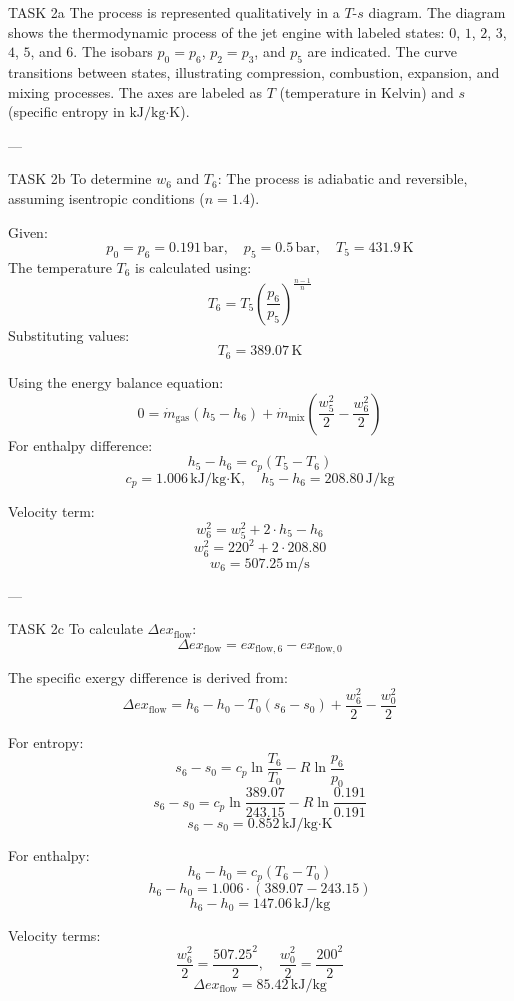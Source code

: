 TASK 2a  
The process is represented qualitatively in a \( T \)-\( s \) diagram. The diagram shows the thermodynamic process of the jet engine with labeled states: \( 0 \), \( 1 \), \( 2 \), \( 3 \), \( 4 \), \( 5 \), and \( 6 \). The isobars \( p_0 = p_6 \), \( p_2 = p_3 \), and \( p_5 \) are indicated. The curve transitions between states, illustrating compression, combustion, expansion, and mixing processes. The axes are labeled as \( T \) (temperature in Kelvin) and \( s \) (specific entropy in \( \text{kJ}/\text{kg·K} \)).

---

TASK 2b  
To determine \( w_6 \) and \( T_6 \):  
The process is adiabatic and reversible, assuming isentropic conditions (\( n = 1.4 \)).  

Given:  
\[
p_0 = p_6 = 0.191 \, \text{bar}, \quad p_5 = 0.5 \, \text{bar}, \quad T_5 = 431.9 \, \text{K}
\]  
The temperature \( T_6 \) is calculated using:  
\[
T_6 = T_5 \left( \frac{p_6}{p_5} \right)^{\frac{n-1}{n}}
\]  
Substituting values:  
\[
T_6 = 389.07 \, \text{K}
\]  

Using the energy balance equation:  
\[
0 = \dot{m}_{\text{gas}} \left( h_5 - h_6 \right) + \dot{m}_{\text{mix}} \left( \frac{w_5^2}{2} - \frac{w_6^2}{2} \right)
\]  
For enthalpy difference:  
\[
h_5 - h_6 = c_p \left( T_5 - T_6 \right)
\]  
\[
c_p = 1.006 \, \text{kJ}/\text{kg·K}, \quad h_5 - h_6 = 208.80 \, \text{J}/\text{kg}
\]  

Velocity term:  
\[
w_6^2 = w_5^2 + 2 \cdot h_5 - h_6
\]  
\[
w_6^2 = 220^2 + 2 \cdot 208.80
\]  
\[
w_6 = 507.25 \, \text{m/s}
\]

---

TASK 2c  
To calculate \( \Delta ex_{\text{flow}} \):  
\[
\Delta ex_{\text{flow}} = ex_{\text{flow},6} - ex_{\text{flow},0}
\]  

The specific exergy difference is derived from:  
\[
\Delta ex_{\text{flow}} = h_6 - h_0 - T_0 \left( s_6 - s_0 \right) + \frac{w_6^2}{2} - \frac{w_0^2}{2}
\]  

For entropy:  
\[
s_6 - s_0 = c_p \ln \frac{T_6}{T_0} - R \ln \frac{p_6}{p_0}
\]  
\[
s_6 - s_0 = c_p \ln \frac{389.07}{243.15} - R \ln \frac{0.191}{0.191}
\]  
\[
s_6 - s_0 = 0.852 \, \text{kJ}/\text{kg·K}
\]  

For enthalpy:  
\[
h_6 - h_0 = c_p \left( T_6 - T_0 \right)
\]  
\[
h_6 - h_0 = 1.006 \cdot \left( 389.07 - 243.15 \right)
\]  
\[
h_6 - h_0 = 147.06 \, \text{kJ}/\text{kg}
\]  

Velocity terms:  
\[
\frac{w_6^2}{2} = \frac{507.25^2}{2}, \quad \frac{w_0^2}{2} = \frac{200^2}{2}
\]  
\[
\Delta ex_{\text{flow}} = 85.42 \, \text{kJ}/\text{kg}
\]

